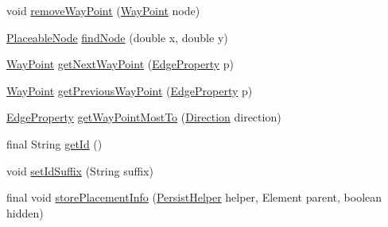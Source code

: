 \begin{DoxyCompactItemize}
\item 
void \hyperlink{classorg_1_1tzi_1_1use_1_1gui_1_1views_1_1diagrams_1_1elements_1_1edges_1_1_edge_base_a79b5ba4af9e0b5da55466a05113a6c07}{remove\-Way\-Point} (\hyperlink{classorg_1_1tzi_1_1use_1_1gui_1_1views_1_1diagrams_1_1waypoints_1_1_way_point}{Way\-Point} node)
\item 
\hyperlink{classorg_1_1tzi_1_1use_1_1gui_1_1views_1_1diagrams_1_1elements_1_1_placeable_node}{Placeable\-Node} \hyperlink{classorg_1_1tzi_1_1use_1_1gui_1_1views_1_1diagrams_1_1elements_1_1edges_1_1_edge_base_afd62ee24921052af7a4069d3aed194e0}{find\-Node} (double x, double y)
\item 
\hyperlink{classorg_1_1tzi_1_1use_1_1gui_1_1views_1_1diagrams_1_1waypoints_1_1_way_point}{Way\-Point} \hyperlink{classorg_1_1tzi_1_1use_1_1gui_1_1views_1_1diagrams_1_1elements_1_1edges_1_1_edge_base_a044981d549a85fd599cd2f1c9ff6399e}{get\-Next\-Way\-Point} (\hyperlink{classorg_1_1tzi_1_1use_1_1gui_1_1views_1_1diagrams_1_1elements_1_1_edge_property}{Edge\-Property} p)
\item 
\hyperlink{classorg_1_1tzi_1_1use_1_1gui_1_1views_1_1diagrams_1_1waypoints_1_1_way_point}{Way\-Point} \hyperlink{classorg_1_1tzi_1_1use_1_1gui_1_1views_1_1diagrams_1_1elements_1_1edges_1_1_edge_base_a385b10db2d0cc3880ff2de95da1305ee}{get\-Previous\-Way\-Point} (\hyperlink{classorg_1_1tzi_1_1use_1_1gui_1_1views_1_1diagrams_1_1elements_1_1_edge_property}{Edge\-Property} p)
\item 
\hyperlink{classorg_1_1tzi_1_1use_1_1gui_1_1views_1_1diagrams_1_1elements_1_1_edge_property}{Edge\-Property} \hyperlink{classorg_1_1tzi_1_1use_1_1gui_1_1views_1_1diagrams_1_1elements_1_1edges_1_1_edge_base_aa68a611f93bab40f68bf169ee81b9744}{get\-Way\-Point\-Most\-To} (\hyperlink{enumorg_1_1tzi_1_1use_1_1gui_1_1views_1_1diagrams_1_1util_1_1_direction}{Direction} direction)
\item 
final String \hyperlink{classorg_1_1tzi_1_1use_1_1gui_1_1views_1_1diagrams_1_1elements_1_1edges_1_1_edge_base_a81a6d094da30d917bbf11e2ddff33064}{get\-Id} ()
\item 
void \hyperlink{classorg_1_1tzi_1_1use_1_1gui_1_1views_1_1diagrams_1_1elements_1_1edges_1_1_edge_base_acbe781d0ab6d766c279bbde5bd3f47df}{set\-Id\-Suffix} (String suffix)
\item 
final void \hyperlink{classorg_1_1tzi_1_1use_1_1gui_1_1views_1_1diagrams_1_1elements_1_1edges_1_1_edge_base_a73cd2870768187e628de4bb1433c8ba5}{store\-Placement\-Info} (\hyperlink{classorg_1_1tzi_1_1use_1_1gui_1_1util_1_1_persist_helper}{Persist\-Helper} helper, Element parent, boolean hidden)

\end{DoxyCompactItemize}
